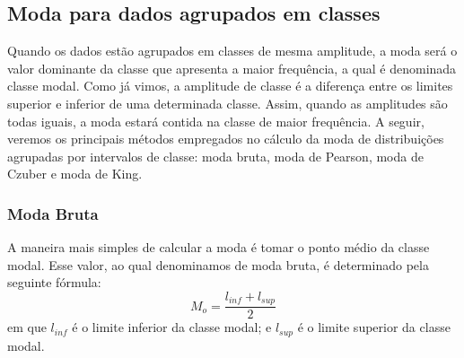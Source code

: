 \subsection{Moda para dados agrupados em classes}

Quando os dados estão agrupados em classes de mesma amplitude, a moda será o valor dominante da classe que apresenta a maior frequência, a qual é denominada classe modal. Como já vimos, a amplitude de classe é a diferença entre os limites superior e inferior de uma determinada classe. Assim, quando as amplitudes são todas iguais, a moda estará contida na classe de maior frequência. A seguir, veremos os principais métodos empregados no cálculo da moda de distribuições agrupadas por intervalos de classe: moda bruta, moda de Pearson, moda de Czuber e moda de King.

\subsubsection{Moda Bruta}

A maneira mais simples de calcular a moda é tomar o ponto médio da classe modal. Esse valor, ao qual denominamos de moda bruta, é determinado pela seguinte fórmula:
\[
    \boxed{M_o=\frac{l_{inf}+l_{sup}}{2}}
\]
em que $l_{inf}$ é o limite inferior da classe modal; e
$l_{sup}$ é o limite superior da classe modal.

